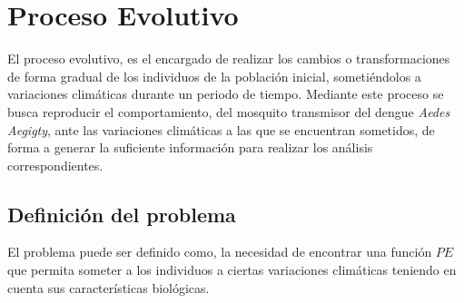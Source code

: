 \section{Proceso Evolutivo}
El proceso evolutivo, es el encargado de realizar los cambios o transformaciones
de forma gradual de los individuos de la población inicial, sometiéndolos a
variaciones climáticas durante un periodo de tiempo. Mediante este proceso se 
busca reproducir el comportamiento, del mosquito transmisor del dengue \textit{Aedes Aegigty}, 
ante las variaciones climáticas a las que se encuentran sometidos, de forma a
generar la suficiente información para realizar los análisis correspondientes.

\subsection{Definición del problema}

El problema puede ser definido como, la necesidad de encontrar una función $PE$ que permita someter a los
individuos a ciertas variaciones climáticas teniendo en cuenta sus características biológicas.

